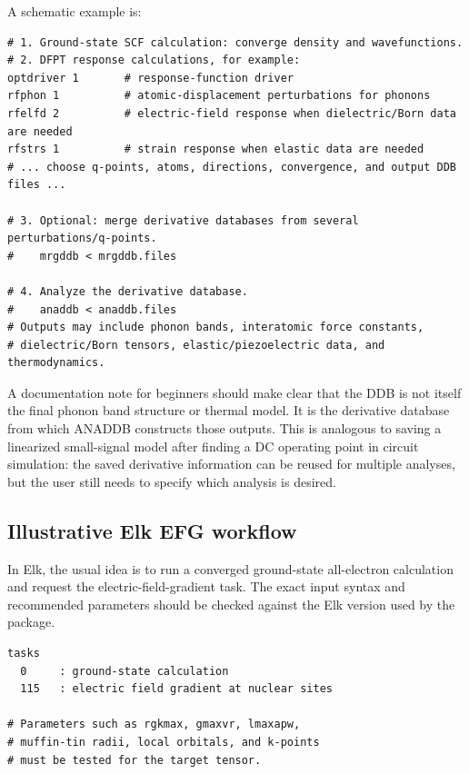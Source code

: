 \documentclass[11pt]{article}
\begin{document}
A schematic example is:

\begin{lstlisting}[language={},caption={Schematic ABINIT response/ANADDB flow, not a complete input deck.}]
# 1. Ground-state SCF calculation: converge density and wavefunctions.
# 2. DFPT response calculations, for example:
optdriver 1       # response-function driver
rfphon 1          # atomic-displacement perturbations for phonons
rfelfd 2          # electric-field response when dielectric/Born data are needed
rfstrs 1          # strain response when elastic data are needed
# ... choose q-points, atoms, directions, convergence, and output DDB files ...

# 3. Optional: merge derivative databases from several perturbations/q-points.
#    mrgddb < mrgddb.files

# 4. Analyze the derivative database.
#    anaddb < anaddb.files
# Outputs may include phonon bands, interatomic force constants,
# dielectric/Born tensors, elastic/piezoelectric data, and thermodynamics.
\end{lstlisting}

A documentation note for beginners should make clear that the DDB is not itself the final phonon band structure or thermal model.  It is the derivative database from which ANADDB constructs those outputs.  This is analogous to saving a linearized small-signal model after finding a DC operating point in circuit simulation: the saved derivative information can be reused for multiple analyses, but the user still needs to specify which analysis is desired.

\subsection{Illustrative Elk EFG workflow}

In Elk, the usual idea is to run a converged ground-state all-electron calculation and request the electric-field-gradient task.  The exact input syntax and recommended parameters should be checked against the Elk version used by the package.

\begin{lstlisting}[language={},caption={Illustrative Elk task fragment.}]
tasks
  0     : ground-state calculation
  115   : electric field gradient at nuclear sites

# Parameters such as rgkmax, gmaxvr, lmaxapw,
# muffin-tin radii, local orbitals, and k-points
# must be tested for the target tensor.
\end{lstlisting}
\end{document}
